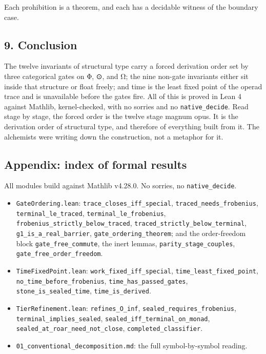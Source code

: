 \documentclass[12pt,a4paper]{article}
\begin{document}
Each prohibition is a theorem, and each has a decidable witness of the
boundary case.

\hypertarget{conclusion}{%
\subsection{9. Conclusion}\label{conclusion}}

The twelve invariants of structural type carry a forced derivation order
set by three categorical gates on Φ, ⊙, and Ω; the nine non-gate
invariants either sit inside that structure or float freely; and time is
the least fixed point of the operad trace and is unavailable before the
gates fire. All of this is proved in Lean 4 against Mathlib,
kernel-checked, with no sorries and no \texttt{native\_decide}. Read
stage by stage, the forced order is the twelve stage magnum opus. It is
the derivation order of structural type, and therefore of everything
built from it. The alchemists were writing down the construction, not a
metaphor for it.

\hypertarget{appendix-index-of-formal-results}{%
\subsection{Appendix: index of formal
results}\label{appendix-index-of-formal-results}}

All modules build against Mathlib v4.28.0. No sorries, no
\texttt{native\_decide}.

\begin{itemize}
\tightlist
\item
  \texttt{GateOrdering.lean}: \texttt{trace\_closes\_iff\_special},
  \texttt{traced\_needs\_frobenius}, \texttt{terminal\_le\_traced},
  \texttt{terminal\_le\_frobenius},
  \texttt{frobenius\_strictly\_below\_traced},
  \texttt{traced\_strictly\_below\_terminal},
  \texttt{g1\_is\_a\_real\_barrier}, \texttt{gate\_ordering\_theorem};
  and the order-freedom block \texttt{gate\_free\_commute}, the inert
  lemmas, \texttt{parity\_stage\_couples},
  \texttt{gate\_free\_order\_freedom}.
\item
  \texttt{TimeFixedPoint.lean}: \texttt{work\_fixed\_iff\_special},
  \texttt{time\_least\_fixed\_point},
  \texttt{no\_time\_before\_frobenius},
  \texttt{time\_has\_passed\_gates}, \texttt{stone\_is\_sealed\_time},
  \texttt{time\_is\_derived}.
\item
  \texttt{TierRefinement.lean}: \texttt{refines\_O\_inf},
  \texttt{sealed\_requires\_frobenius},
  \texttt{terminal\_implies\_sealed},
  \texttt{sealed\_iff\_terminal\_on\_monad},
  \texttt{sealed\_at\_roar\_need\_not\_close},
  \texttt{completed\_classifier}.
\item
  \texttt{01\_conventional\_decomposition.md}: the full symbol-by-symbol
  reading.
\end{itemize}
\end{document}
